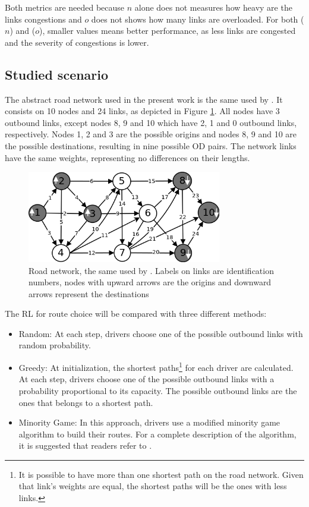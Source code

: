 \documentclass{RITA}
\begin{document}
Both metrics are needed because $n$ alone does not measures how heavy are the links congestions and $o$ does not shows how many links are overloaded. For both ($n$) and ($o$), smaller values means better performance, as less links are congested and the severity of congestions is lower.

\subsection{Studied scenario} 

The abstract road network used in the present work is the same used by \cite{Galib&Moser2011}. It consists on 10 nodes and 24 links, as depicted in Figure \ref{fig:roadnetwork}. All nodes have 3 outbound links, except nodes 8, 9 and 10 which have 2, 1 and 0 outbound links, respectively. Nodes 1, 2 and 3 are the possible origins and nodes 8, 9 and 10 are the possible destinations, resulting in nine possible OD pairs. The network links have the same weights, representing no differences on their lengths.

\begin{figure}[ht]
    \centerline{\includegraphics[width=8.5cm]{img/roadnetwork.png}}
    \caption{Road network, the same used by \cite{Galib&Moser2011}. Labels on links are identification numbers, nodes with upward arrows are the origins and downward arrows represent the destinations}
    \label{fig:roadnetwork}
\end{figure}

The RL for route choice will be compared with three different methods:

\begin{itemize}
  \item Random: At each step, drivers choose one of the possible outbound links with random probability.
  \item Greedy: At initialization, the shortest paths\footnote{It is possible to have more than one shortest path on the road network. Given that link's weights are equal, the shortest paths will be the ones with less links.} for each driver are calculated. At each step, drivers choose one of the possible outbound links with a probability proportional to its capacity. The possible outbound links are the ones that belongs to a shortest path. %
  \item Minority Game: In this approach, drivers use a modified minority game algorithm to build their routes. For a complete description of the algorithm, it is suggested that readers refer to \cite{Galib&Moser2011}.
\end{itemize}
\end{document}
